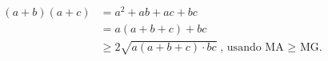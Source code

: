 \begin{align*}
	(a+b)(a+c) & = a^2 + ab + ac + bc \\
			   & = a(a+b+c) + bc \\
			   & \ge 2 \sqrt{ a(a+b+c) \cdot bc } \text{, usando MA $\ge$ MG.}
\end{align*}
